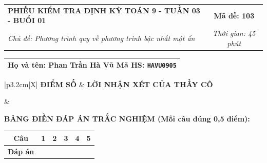 \documentclass[12pt,a4paper]{article}
\begin{document}
\newpage


\noindent
\begin{tabularx}{\linewidth}{|X|c|}
\hline
\textbf{PHIẾU KIỂM TRA ĐỊNH KỲ TOÁN 9 - TUẦN 03 - BUỔI 01} & \textbf{Mã đề: 103} \\
\textit{Chủ đề: Phương trình quy về phương trình bậc nhất một ẩn} & \textit{Thời gian: 45 phút} \\
\hline
\end{tabularx}

\vspace{1mm}

\noindent
\begin{tabularx}{\linewidth}{|X|}
\hline
\rule[-2mm]{0pt}{7.5mm}\textbf{Họ và tên:} \textbf{\large Phan Trần Hà Vũ} \hfill \textbf{Mã HS:} \texttt{HAVU0905} \quad \\
\hline
\end{tabularx}

\vspace{1mm}

\noindent
\begin{tabularx}{\linewidth}{|p{3.2cm}|X|}
\hline
\centering\textbf{ĐIỂM SỐ} & \centering\textbf{LỜI NHẬN XÉT CỦA THẦY CÔ} \tabularnewline
\hline
\rule{0pt}{1.3cm} & \tabularnewline
\hline
\end{tabularx}

\vspace{1.2mm}

\noindent\textbf{BẢNG ĐIỀN ĐÁP ÁN TRẮC NGHIỆM (Mỗi câu đúng 0,5 điểm):}
\vspace{0.8mm}

\noindent
\renewcommand{\arraystretch}{1.35}
\begin{tabularx}{\linewidth}{|c|*{5}{>{\centering\arraybackslash}X|}}
\hline
\textbf{Câu} & \textbf{1} & \textbf{2} & \textbf{3} & \textbf{4} & \textbf{5} \\
\hline
\textbf{Đáp án} & & & & & \\
\hline
\end{tabularx}
\renewcommand{\arraystretch}{1.0}

\vspace{1.5mm}
\end{document}

